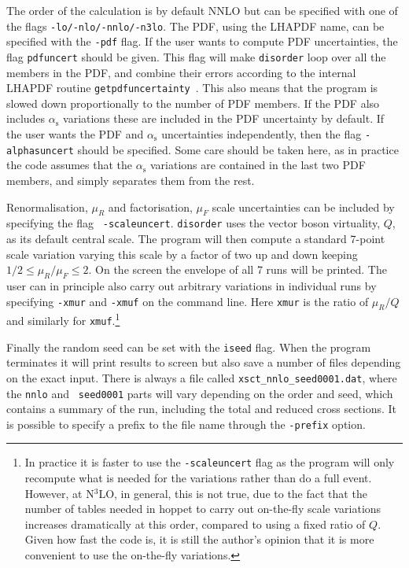 \documentclass[submission, PhysCodeb]{SciPost}
\newcommand{\hoppet}{{\sc hoppet}}
\newcommand{\disorder}{{\tt disorder}}
\newcommand{\as}{\alpha_{\mathrm{s}}}
\newcommand{\NNNLO}{N$^3$LO}
\begin{document}
The order of the calculation is by default NNLO but can be specified
with one of the flags {\tt -lo/-nlo/-nnlo/-n3lo}. The PDF, using the
LHAPDF name, can be specified with the {\tt -pdf} flag. If the user
wants to compute PDF uncertainties, the flag {\tt pdfuncert} should be
given. This flag will make \disorder{} loop over all the members in
the PDF, and combine their errors according to the internal LHAPDF
routine {\tt getpdfuncertainty}~\cite{Watt:2011kp}. This also means
that the program is slowed down proportionally to the number of PDF
members. If the PDF also includes $\as$ variations these are included
in the PDF uncertainty by default. If the user wants the PDF and $\as$
uncertainties independently, then the flag {\tt -alphasuncert} should
be specified. Some care should be taken here, as in practice the code
assumes that the $\as$ variations are contained in the last two PDF
members, and simply separates them from the rest.

Renormalisation, $\mu_R$ and factorisation, $\mu_F$ scale
uncertainties can be included by specifying the flag {\tt
  -scaleuncert}. \disorder{} uses the vector boson virtuality, $Q$, as
its default central scale. The program will then compute a standard
7-point scale variation varying this scale by a factor of two up and
down keeping $1/2\le \mu_R/\mu_F\le 2$. On the screen the envelope of
all 7 runs will be printed. The user can in principle also carry out
arbitrary variations in individual runs by specifying {\tt -xmur} and
{\tt -xmuf} on the command line. Here {\tt xmur} is the ratio of
$\mu_R/Q$ and similarly for {\tt xmuf}.\footnote{In practice it is
faster to use the {\tt -scaleuncert} flag as the program will only
recompute what is needed for the variations rather than do a full
event. However, at \NNNLO{}, in general, this is not true, due to the fact
that the number of tables needed in \hoppet{} to carry out on-the-fly
scale variations increases dramatically at this order, compared to
using a fixed ratio of $Q$. Given how fast the code is, it is still
the author's opinion that it is more convenient to use the on-the-fly
variations.}

Finally the random seed can be set with the {\tt iseed} flag. When the
program terminates it will print results to screen but also save a
number of files depending on the exact input. There is always a file
called {\tt xsct\_nnlo\_seed0001.dat}, where the {\tt nnlo} and {\tt
  seed0001} parts will vary depending on the order and seed, which
contains a summary of the run, including the total and reduced cross
sections. It is possible to specify a prefix to the file name through
the {\tt -prefix} option.
\end{document}
